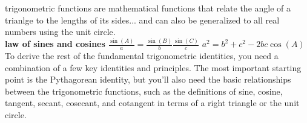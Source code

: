 \documentclass{article}
\begin{document}
trigonometric functions are mathematical functions that relate the angle of a trianlge to the lengths of its sides... and can also be generalized to all real numbers using the unit circle.\\

\textbf{law of sines and cosines}
	$\frac{\sin(A)}{a} = \frac{\sin(B)}{b} \frac{\sin(C)}{c}$
	$a^2 = b^2 + c^2 - 2bc\cos(A)$\\

To derive the rest of the fundamental trigonometric identities, you need a combination of a few key identities and principles. The most important starting point is the Pythagorean identity, but you’ll also need the basic relationships between the trigonometric functions, such as the definitions of sine, cosine, tangent, secant, cosecant, and cotangent in terms of a right triangle or the unit circle. \\
\end{document}
